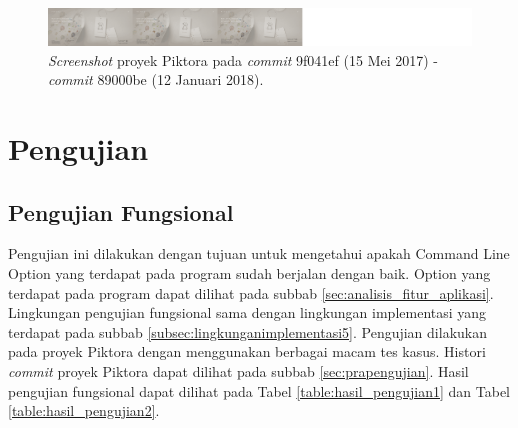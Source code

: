 \begin{enumerate}
\begin{figure}[H]
	
		\includegraphics[scale=0.3]{Gambar/Untitled-12.png}
	\caption{\textit{Screenshot} proyek Piktora pada \textit{commit} 9f041ef (15 Mei 2017) - \textit{commit} 89000be (12 Januari 2018).}
	\label{fig:c12}
\end{figure}


\end{enumerate}
\section{Pengujian}
\label{sec:pengujian}

\subsection{Pengujian Fungsional}
\label{sec:pengujian_fungsional} 
Pengujian ini dilakukan dengan tujuan untuk mengetahui apakah Command Line Option yang terdapat pada program sudah berjalan dengan baik. Option yang terdapat pada program dapat dilihat pada subbab \ref{sec:analisis_fitur_aplikasi}. Lingkungan pengujian fungsional sama dengan lingkungan implementasi yang terdapat pada subbab \ref{subsec:lingkunganimplementasi5}. Pengujian dilakukan pada proyek Piktora dengan menggunakan berbagai macam tes kasus. Histori \textit{commit} proyek Piktora dapat dilihat pada subbab \ref{sec:prapengujian}. Hasil pengujian fungsional dapat dilihat pada Tabel \ref{table:hasil_pengujian1} dan Tabel \ref{table:hasil_pengujian2}.


